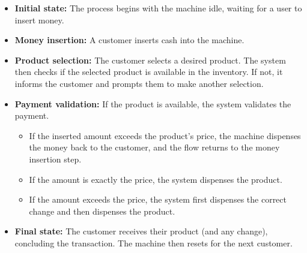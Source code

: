 \begin{itemize}
\item
\protect{}\label{dUU1udyYwOxFXCGCK61au}
\textbf{Initial state:} The process begins with the machine idle, waiting for a user to insert money.
\item
\protect{}\label{U8q5ahRT_oIMqS187EAlk}
\textbf{Money insertion:} A customer inserts cash into the machine.
\item
\protect{}\label{xxas9Q4WtmZSOh37uTZVi}
\textbf{Product selection:} The customer selects a desired product. The system then checks if the selected product is available in the inventory. If not, it informs the customer and prompts them to make another selection.
\item
\protect{}\label{JQ6UF8eAW7t5ukCkN01nb}
\textbf{Payment validation:} If the product is available, the system validates the payment.

\begin{itemize}
\item
If the inserted amount exceeds the product's price, the machine dispenses the money back to the customer, and the flow returns to the money insertion step.
\item
If the amount is exactly the price, the system dispenses the product.
\item
If the amount exceeds the price, the system first dispenses the correct change and then dispenses the product.
\end{itemize}
\item
\protect{}\label{ZznUgd7VFw_I83urjEvzj}
\textbf{Final state:} The customer receives their product (and any change), concluding the transaction. The machine then resets for the next customer.
\end{itemize}

